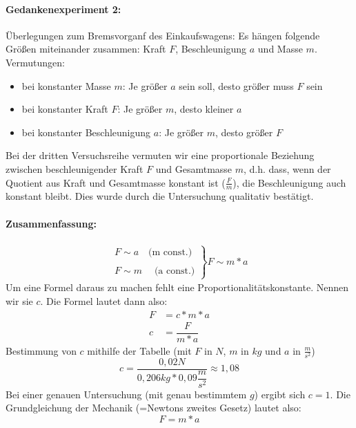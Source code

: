 \documentclass[12pt]{article}
\numberwithin{equation}{subsection}
\begin{document}
	\paragraph{Gedankenexperiment 2:}
	Überlegungen zum Bremsvorganf des Einkaufswagens: Es hängen folgende Größen miteinander zusammen: Kraft $ F $, Beschleunigung $ a $ und Masse $ m $.\\
	Vermutungen:
	\begin{itemize}
		\item bei konstanter Masse $ m $: Je größer $ a $ sein soll, desto größer muss $ F $ sein
		\item bei konstanter Kraft $ F $: Je größer $ m $, desto kleiner $ a $
		\item bei konstanter Beschleunigung $ a $: Je größer $ m $, desto größer $ F $
	\end{itemize}
	Bei der dritten Versuchsreihe vermuten wir eine proportionale Beziehung zwischen beschleunigender Kraft $ F $ und Gesamtmasse $ m $, d.h. dass, wenn der Quotient aus Kraft und Gesamtmasse konstant ist ($ \frac{F}{m} $), die Beschleunigung auch konstant bleibt. Dies wurde durch die Untersuchung qualitativ bestätigt.
	\paragraph{Zusammenfassung:}
	\begin{align}
		\left.
		\begin{array}{c}
		F \sim a \quad\text{(m const.)}\\
		\\
		F \sim m \; \quad\text{(a const.)}
		\end{array}
		\right\}
		F \sim m*a
	\end{align}
	Um eine Formel daraus zu machen fehlt eine Proportionalitätskonstante. Nennen wir sie $c$. Die Formel lautet dann also:
	\begin{align}
		F &= c*m*a\\
		c &= \dfrac{F}{m*a}
	\end{align}
	Bestimmung von $ c $ mithilfe der Tabelle (mit $ F $ in $ N $, $ m $ in $ kg $ und $ a $ in $ \frac{m}{s^2} $)
	\begin{equation}
		c = \dfrac{0,02N}{0,206kg*0,09\dfrac{m}{s^2}} \approx 1,08
	\end{equation}
	Bei einer genauen Untersuchung (mit genau bestimmtem $ g $) ergibt sich $ c=1 $. Die Grundgleichung der Mechanik (=Newtons zweites Gesetz) lautet also:
	\begin{equation}
		F = m*a
	\end{equation}
	
\end{document}
